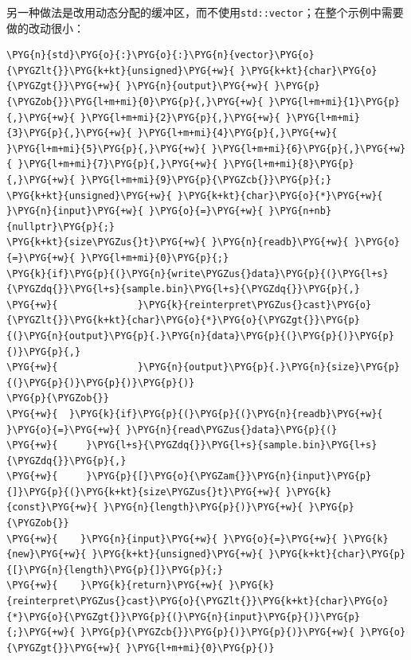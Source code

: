 
另一种做法是改用动态分配的缓冲区，而不使用\texttt{std::\allowbreak{}vector}；在整个示例中需要做的改动很小：



\begin{codeblockbg}
\begin{Verbatim}[commandchars=\\\{\},breaklines=true,breakanywhere=true,fontsize=\codefont,xleftmargin=17bp]
\PYG{n}{std}\PYG{o}{:}\PYG{o}{:}\PYG{n}{vector}\PYG{o}{\PYGZlt{}}\PYG{k+kt}{unsigned}\PYG{+w}{ }\PYG{k+kt}{char}\PYG{o}{\PYGZgt{}}\PYG{+w}{ }\PYG{n}{output}\PYG{+w}{ }\PYG{p}{\PYGZob{}}\PYG{l+m+mi}{0}\PYG{p}{,}\PYG{+w}{ }\PYG{l+m+mi}{1}\PYG{p}{,}\PYG{+w}{ }\PYG{l+m+mi}{2}\PYG{p}{,}\PYG{+w}{ }\PYG{l+m+mi}{3}\PYG{p}{,}\PYG{+w}{ }\PYG{l+m+mi}{4}\PYG{p}{,}\PYG{+w}{ }\PYG{l+m+mi}{5}\PYG{p}{,}\PYG{+w}{ }\PYG{l+m+mi}{6}\PYG{p}{,}\PYG{+w}{ }\PYG{l+m+mi}{7}\PYG{p}{,}\PYG{+w}{ }\PYG{l+m+mi}{8}\PYG{p}{,}\PYG{+w}{ }\PYG{l+m+mi}{9}\PYG{p}{\PYGZcb{}}\PYG{p}{;}
\PYG{k+kt}{unsigned}\PYG{+w}{ }\PYG{k+kt}{char}\PYG{o}{*}\PYG{+w}{ }\PYG{n}{input}\PYG{+w}{ }\PYG{o}{=}\PYG{+w}{ }\PYG{n+nb}{nullptr}\PYG{p}{;}
\PYG{k+kt}{size\PYGZus{}t}\PYG{+w}{ }\PYG{n}{readb}\PYG{+w}{ }\PYG{o}{=}\PYG{+w}{ }\PYG{l+m+mi}{0}\PYG{p}{;}
\PYG{k}{if}\PYG{p}{(}\PYG{n}{write\PYGZus{}data}\PYG{p}{(}\PYG{l+s}{\PYGZdq{}}\PYG{l+s}{sample.bin}\PYG{l+s}{\PYGZdq{}}\PYG{p}{,}
\PYG{+w}{              }\PYG{k}{reinterpret\PYGZus{}cast}\PYG{o}{\PYGZlt{}}\PYG{k+kt}{char}\PYG{o}{*}\PYG{o}{\PYGZgt{}}\PYG{p}{(}\PYG{n}{output}\PYG{p}{.}\PYG{n}{data}\PYG{p}{(}\PYG{p}{)}\PYG{p}{)}\PYG{p}{,}
\PYG{+w}{              }\PYG{n}{output}\PYG{p}{.}\PYG{n}{size}\PYG{p}{(}\PYG{p}{)}\PYG{p}{)}\PYG{p}{)}
\PYG{p}{\PYGZob{}}
\PYG{+w}{  }\PYG{k}{if}\PYG{p}{(}\PYG{p}{(}\PYG{n}{readb}\PYG{+w}{ }\PYG{o}{=}\PYG{+w}{ }\PYG{n}{read\PYGZus{}data}\PYG{p}{(}
\PYG{+w}{     }\PYG{l+s}{\PYGZdq{}}\PYG{l+s}{sample.bin}\PYG{l+s}{\PYGZdq{}}\PYG{p}{,}
\PYG{+w}{     }\PYG{p}{[}\PYG{o}{\PYGZam{}}\PYG{n}{input}\PYG{p}{]}\PYG{p}{(}\PYG{k+kt}{size\PYGZus{}t}\PYG{+w}{ }\PYG{k}{const}\PYG{+w}{ }\PYG{n}{length}\PYG{p}{)}\PYG{+w}{ }\PYG{p}{\PYGZob{}}
\PYG{+w}{    }\PYG{n}{input}\PYG{+w}{ }\PYG{o}{=}\PYG{+w}{ }\PYG{k}{new}\PYG{+w}{ }\PYG{k+kt}{unsigned}\PYG{+w}{ }\PYG{k+kt}{char}\PYG{p}{[}\PYG{n}{length}\PYG{p}{]}\PYG{p}{;}
\PYG{+w}{    }\PYG{k}{return}\PYG{+w}{ }\PYG{k}{reinterpret\PYGZus{}cast}\PYG{o}{\PYGZlt{}}\PYG{k+kt}{char}\PYG{o}{*}\PYG{o}{\PYGZgt{}}\PYG{p}{(}\PYG{n}{input}\PYG{p}{)}\PYG{p}{;}\PYG{+w}{ }\PYG{p}{\PYGZcb{}}\PYG{p}{)}\PYG{p}{)}\PYG{+w}{ }\PYG{o}{\PYGZgt{}}\PYG{+w}{ }\PYG{l+m+mi}{0}\PYG{p}{)}

\end{Verbatim}
\end{codeblockbg}
